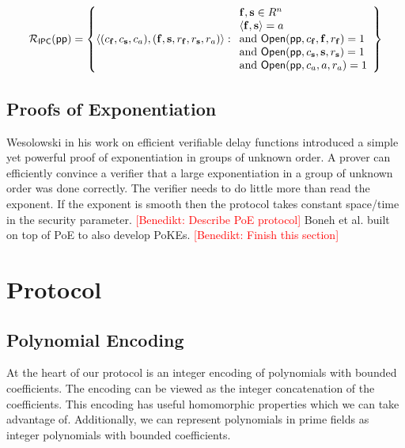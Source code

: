 \documentclass{article}
\theoremstyle{definition}
\newcommand{\benedikt}[1]{{\textcolor{red}{[Benedikt: #1]}}}
\newcommand{\benedikt}[1]{}
\begin{document}
\[ 
\mathcal{R_\textsf{IPC}}(\textsf{pp}) = \left\{
\langle (c_\mathbf{f}, c_\mathbf{s}, c_{a}), (\mathbf{f}, \mathbf{s}, r_\mathbf{f}, r_\mathbf{s}, r_{a}) \rangle
: 
\begin{array}{l} 
\mathbf{f}, \mathbf{s} \in R^n \ \\
\langle \mathbf{f}, \mathbf{s} \rangle = a \\ 
 \text{and} \ \textsf{{Open}}(\textsf{pp}, c_\mathbf{f}, \mathbf{f}, r_\mathbf{f}) = 1 \\
 \text{and} \ \textsf{{Open}}(\textsf{pp}, c_\mathbf{s}, \mathbf{s}, r_\mathbf{s}) = 1 \\
 \text{and} \ \textsf{{Open}}(\textsf{pp}, c_{a}, a, r_{a}) = 1
\end{array}
\right\}
\] 

\subsection{Proofs of Exponentiation}
Wesolowski \cite{EC:Wesolowski19} in his work on efficient verifiable delay functions introduced a simple yet powerful proof of exponentiation in groups of unknown order. A prover can efficiently convince a verifier that a large exponentiation in a group of unknown order was done correctly. The verifier needs to do little more than read the exponent. If the exponent is smooth then the protocol takes constant space/time in the security parameter.
\benedikt{Describe PoE protocol}
Boneh et al. \cite{journals/iacr/BonehBF18a} built on top of PoE to also develop PoKEs. \benedikt{Finish this section}
\section{Protocol}
\label{sec:protocol}

\subsection{Polynomial Encoding}
At the heart of our protocol is an integer encoding of polynomials with bounded coefficients. The encoding can be viewed as the integer concatenation of the coefficients. This encoding has useful homomorphic properties which we can take advantage of. Additionally, we can represent polynomials in prime fields as integer polynomials with bounded coefficients.
\end{document}

